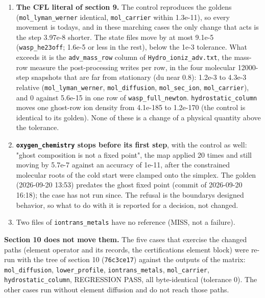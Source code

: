 \documentclass[english,a4paper]{my_memo}
\providecommand{\tightlist}{\setlength{\itemsep}{0pt}\setlength{\parskip}{0pt}}
\begin{document}
\begin{enumerate}
\def\labelenumi{\arabic{enumi}.}
\tightlist
\item
  \textbf{The CFL literal of section 9.} The control reproduces the goldens
  (\texttt{mol\_lyman\_werner} identical, \texttt{mol\_carrier} within 1.3e-11), so every
  movement is today\textquotesingle s, and in these marching cases the only change that acts
  is the step 3.97e-8 shorter. The state files move by at most 9.1e-5
  (\texttt{wasp\_he23off}; 1.6e-5 or less in the rest), below the 1e-3 tolerance.
  What exceeds it is the \texttt{adv\_mass\_row} column of \texttt{Hydro\_ioniz\_adv.txt}, the
  mass-row measure the post-processing writes per row, in the four
  molecular 12000-step snapshots that are far from stationary (du near 0.8):
  1.2e-3 to 4.3e-3 relative (\texttt{mol\_lyman\_werner}, \texttt{mol\_diffusion},
  \texttt{mol\_sec\_ion}, \texttt{mol\_carrier}), and 0 against 5.6e-15 in one row of
  \texttt{wasp\_full\_newton}. \texttt{hydrostatic\_column} moves one ghost-row ion density
  from 4.1e-185 to 1.2e-170 (the control is identical to its golden). None
  of these is a change of a physical quantity above the tolerance.
\item
  \textbf{\texttt{oxygen\_chemistry} stops before its first step}, with the control as
  well: "ghost composition is not a fixed point", the map applied 20 times
  and still moving by 5.7e-7 against an accuracy of 1e-11, after the
  constrained molecular roots of the cold start were clamped onto the
  simplex. The golden (2026-09-20 13:53) predates the ghost fixed point
  (commit of 2026-09-20 16:18); the case has not run since. The refusal is
  the boundary\textquotesingle s designed behavior, so what to do with it is reported for a
  decision, not changed.
\item
  Two files of \texttt{iontrans\_metals} have no reference (MISS, not a failure).
\end{enumerate}

\textbf{Section 10 does not move them.} The five cases that exercise the changed
paths (element operator and its records, the certification\textquotesingle s element block)
were re-run with the tree of section 10 (\texttt{76c3ce17}) against the outputs of
the matrix: \texttt{mol\_diffusion}, \texttt{lower\_profile}, \texttt{iontrans\_metals},
\texttt{mol\_carrier}, \texttt{hydrostatic\_column}, REGRESSION PASS, all byte-identical
(tolerance 0). The other cases run without element diffusion and do not
reach those paths.
\end{document}
